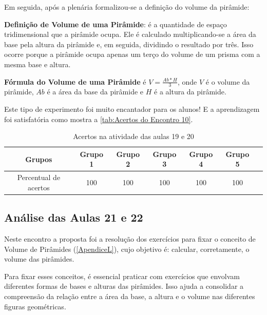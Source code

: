 Em seguida, após a plenária formalizou-se a definição do volume da pirâmide:

\textbf{Definição de Volume de uma Pirâmide}: é a quantidade de espaço tridimensional que a pirâmide ocupa. Ele é calculado multiplicando-se a área da base pela altura da pirâmide e, em seguida, dividindo o resultado por três. Isso ocorre porque a pirâmide ocupa apenas um terço do volume de um prisma com a mesma base e altura.

\textbf{Fórmula do Volume de uma Pirâmide} é $V = \frac{Ab *H}{3}$, onde $V$ é o volume da pirâmide, $Ab$ é a área da base da pirâmide e $H$ é a altura da pirâmide.

Este tipo de experimento foi muito encantador para os alunos! E a aprendizagem foi satisfatória como mostra a \autoref{tab:Acertos do Encontro 10}.

\begin{table}[htbp] \centering
    \caption{Acertos na atividade das aulas 19 e 20} \label{tab:Acertos do Encontro 10}
    \begin{tabular}{|c|c|c|c|c|c|c|}
        \hline
        \textbf{Grupos}       & \textbf{Grupo 1} & \textbf{Grupo 2} & \textbf{Grupo 3} & \textbf{Grupo 4} & \textbf{Grupo 5} \\
        \hline
        Percentual de acertos & 100              & 100              & 100              & 100              & 100              \\
        \hline
    \end{tabular}
    \legend{\legendaTabela}
\end{table}

\subsection{Análise das Aulas 21 e 22}

Neste encontro a proposta foi a resolução dos exercícios para fixar o conceito de Volume de Pirâmides (\autoref{ApendiceL}), cujo objetivo é: calcular, corretamente, o volume das pirâmides.

Para fixar esses conceitos, é essencial praticar com exercícios que envolvam diferentes formas de bases e alturas das pirâmides. Isso ajuda a consolidar a compreensão da relação entre a área da base, a altura e o volume nas diferentes figuras geométricas.



